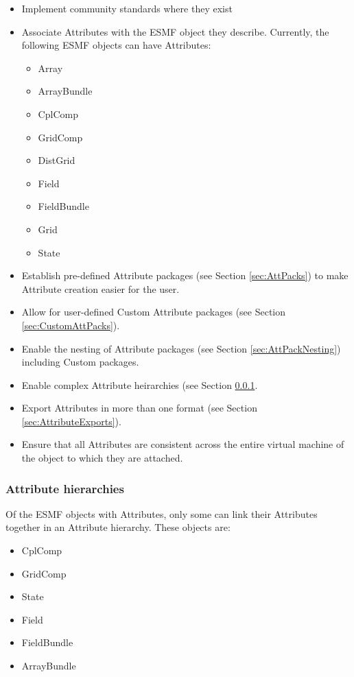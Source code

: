 \begin{itemize}
  \item Implement community standards where they exist
  \item Associate Attributes with the ESMF object they describe. Currently, the following ESMF objects can have Attributes:
  \begin{itemize}
     \item Array
     \item ArrayBundle
     \item CplComp
     \item GridComp
     \item DistGrid
     \item Field
     \item FieldBundle
     \item Grid
     \item State
     \end{itemize}
  \item Establish pre-defined Attribute packages (see Section \ref{sec:AttPacks}) to make Attribute creation easier for the user.
  \item Allow for user-defined Custom Attribute packages (see Section \ref{sec:CustomAttPacks}).
  \item Enable the nesting of Attribute packages (see Section \ref{sec:AttPackNesting}) including Custom packages.
  \item Enable complex Attribute heirarchies (see Section \ref{sec:AttHier}.
  \item Export Attributes in more than one format (see Section \ref{sec:AttributeExports}).
  \item Ensure that all Attributes are consistent across the entire virtual machine of the object to which they are attached.
\end{itemize}

\subsubsection{Attribute hierarchies}
\label{sec:AttHier}

Of the ESMF objects with Attributes, only some can link their Attributes together in an Attribute hierarchy.  These objects are:

\begin{itemize}
\item CplComp
\item GridComp
\item State
\item Field
\item FieldBundle
\item ArrayBundle
\end{itemize}

